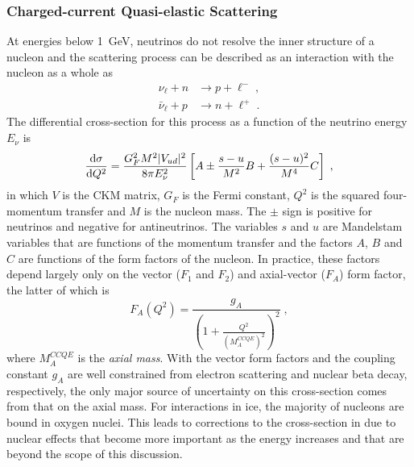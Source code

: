 \subsubsection{Charged-current Quasi-elastic Scattering}
At energies below \SI{1}{GeV}, neutrinos do not resolve the inner structure of a nucleon and the scattering process can be described as an interaction with the nucleon as a whole as
\begin{equation}
\begin{aligned}
    \nu_\ell + n &\rightarrow p + \ell^-\;,\\
    \bar{\nu}_\ell + p &\rightarrow n + \ell^+\;.
\end{aligned}
\end{equation}
The differential cross-section for this process as a function of the neutrino energy $E_\nu$ is
\begin{equation}
    \frac{\mathrm{d}\sigma}{\mathrm{d} Q^2} = \frac{G_F^2 M^2 |V_{ud}|^2}{8\pi E^2_\nu}
    \left[
        A \pm \frac{s-u}{M^2}B + \frac{(s-u)^2}{M^4}C
    \right]\;,\label{eq:ccqe-xsec}
\end{equation}
in which $V$ is the CKM matrix, $G_F$ is the Fermi constant, $Q^2$ is the squared four-momentum transfer and $M$ is the nucleon mass. The $\pm$ sign is positive for neutrinos and negative for antineutrinos. The variables $s$ and $u$ are Mandelstam variables that are functions of the momentum transfer and the factors $A$, $B$ and $C$ are functions of the form factors of the nucleon. In practice, these factors depend largely only on the vector ($F_1$ and $F_2$) and axial-vector ($F_A$) form factor, the latter of which is
\begin{equation}
    F_A(Q^2) = \frac{g_A}{\left(1 + \frac{Q^2}{(M_A^{CCQE})^2}\right)^2}\;,\label{eq:axial-mass-form-factor}
\end{equation}
where $M_A^{CCQE}$ is the \emph{axial mass}. With the vector form factors and the coupling constant $g_A$ are well constrained from electron scattering and nuclear beta decay, respectively, the only major source of uncertainty on this cross-section comes from that on the axial mass. For interactions in ice, the majority of nucleons are bound in oxygen nuclei. This leads to corrections to the cross-section in  due to nuclear effects that become more important as the energy increases and that are beyond the scope of this discussion.

